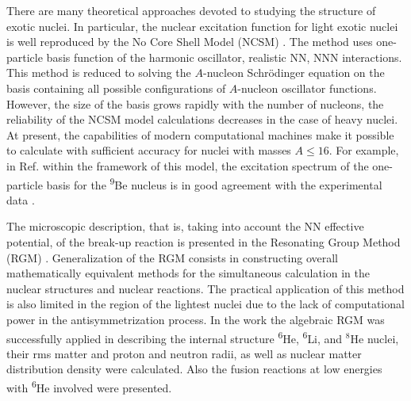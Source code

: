 \documentclass[
12pt, %
oneside, %
english, %
doublespacing, %
doublespacing, %
toctotoc, %
parskip, %
headsepline, %
]{MastersDoctoralThesis} %
\newcommand{\he}{\textsuperscript{6}He\xspace}
\newcommand{\li}{\textsuperscript{6}Li\xspace}
\newcommand{\be}{\textsuperscript{9}Be\xspace}
\begin{document}
There are many theoretical approaches \cite{descouvemont200112be, tohsaki2001alpha, kanada1995structure, pudliner1997quantum, zhukov1993bound}  devoted to studying the structure of exotic nuclei. In particular, the nuclear excitation function for light exotic nuclei is well reproduced by the No Core Shell Model (NCSM) \cite{navratil2009recent, forssen2005large, navratil2003ab, navratil2002ab}. 
The method uses one-particle basis function of the harmonic oscillator,  realistic NN, NNN interactions. 
This method is reduced to solving the $A$-nucleon Schr\"{o}dinger equation on the basis containing all possible configurations of $A$-nucleon oscillator functions. 
However, the size of the basis grows rapidly with the number of nucleons, the reliability of the NCSM model calculations decreases in the case of heavy nuclei. At present, the capabilities of modern computational machines make it possible to calculate with sufficient accuracy for nuclei with masses $A \le 16$.
For example, in Ref. \cite{forssen2005large} within the framework of this model, the excitation spectrum of the one-particle basis for the \be nucleus is in good agreement with the experimental data \cite{tilley2004energy}. 

The microscopic description, that is, taking into account the NN effective potential, of the break-up reaction is presented in the Resonating Group Method (RGM) \cite{horiuchi1970generator, tang1978resonating, wheeler1937mathematical}. Generalization of the RGM consists in constructing overall mathematically equivalent methods for the simultaneous calculation in the nuclear structures and nuclear reactions. 
The practical application of this method is also limited in the region of the lightest nuclei due to the lack of computational power in the antisymmetrization process.
In the work \cite{nesterov2010three} the algebraic RGM was successfully applied in describing the internal structure \he, \li, and $^8$He nuclei, their rms matter and proton
and neutron radii, as well as nuclear matter distribution density were calculated. Also the fusion reactions at low energies with \he involved were presented.
\end{document}
